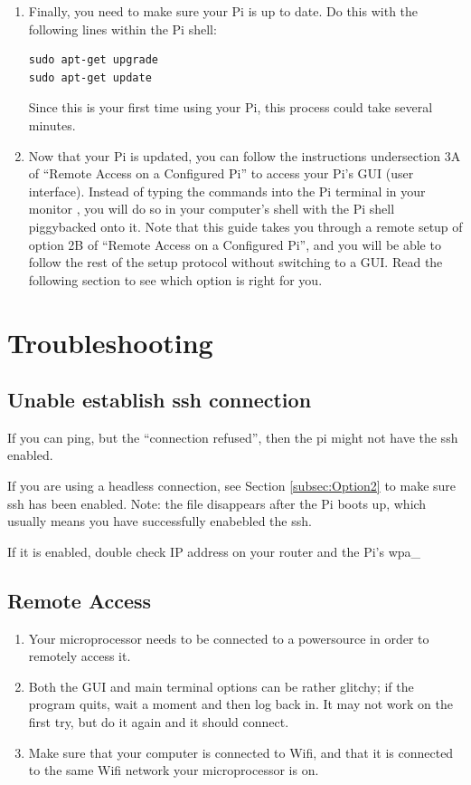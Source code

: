 \documentclass{article}\usepackage[]{graphicx}\usepackage[]{color}
\begin{document}
\begin{enumerate}

\item Finally, you need to make sure your Pi is up to date.  Do this with the following lines within the Pi shell:
\begin{lstlisting}
sudo apt-get upgrade
sudo apt-get update
\end{lstlisting}
Since this is your first time using your Pi, this process could take several minutes.

\item Now that your Pi is updated, you can follow the instructions undersection 3A of ``Remote Access on a Configured Pi'' to access your Pi's GUI (user interface).  Instead of typing the commands into the Pi terminal in your monitor , you will do so in your computer's shell with the Pi shell piggybacked onto it.  Note that this guide takes you through a remote setup of option 2B of ``Remote Access on a Configured Pi'', and you will be able to follow the rest of the setup protocol without switching to a GUI.  Read the following section to see which option is right for you.

\end{enumerate}

\section{Troubleshooting}

\subsection{Unable establish ssh connection}

If you can ping, but the ``connection refused'', then the pi might not have the ssh enabled. 

If you are using a headless connection, see Section \ref{subsec:Option2} to make sure ssh has been enabled. Note: the file disappears after the Pi boots up, which usually means you have successfully enabebled the ssh.

If it is enabled, double check IP address on your router and the Pi's wpa\_

\subsection{Remote Access}

\begin{enumerate}

\item Your microprocessor needs to be connected to a powersource in order to remotely access it.

\item Both the GUI and main terminal options can be rather glitchy; if the program quits, wait a moment and then log back in.  It may not work on the first try, but do it again and it should connect.

\item Make sure that your computer is connected to Wifi, and that it is connected to the same Wifi network your microprocessor is on.

\end{enumerate}
\end{document}
